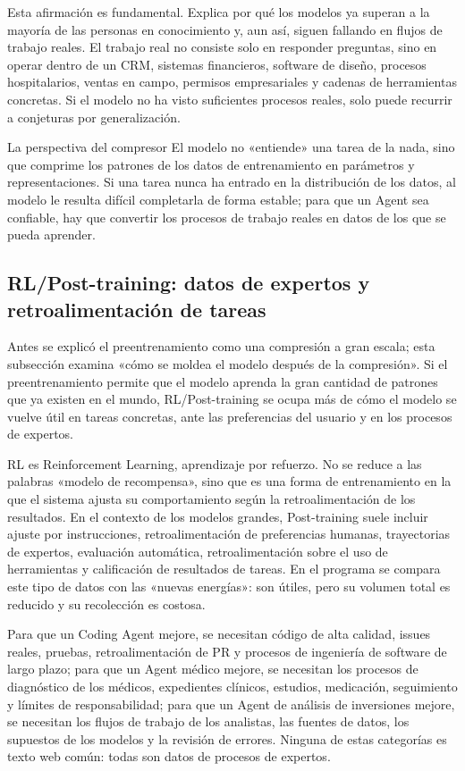 Esta afirmación es fundamental. Explica por qué los modelos ya superan a la mayoría de las personas en conocimiento y, aun así, siguen fallando en flujos de trabajo reales. El trabajo real no consiste solo en responder preguntas, sino en operar dentro de un CRM, sistemas financieros, software de diseño, procesos hospitalarios, ventas en campo, permisos empresariales y cadenas de herramientas concretas. Si el modelo no ha visto suficientes procesos reales, solo puede recurrir a conjeturas por generalización.

\begin{importantbox}{La perspectiva del compresor}
El modelo no «entiende» una tarea de la nada, sino que comprime los patrones de los datos de entrenamiento en parámetros y representaciones. Si una tarea nunca ha entrado en la distribución de los datos, al modelo le resulta difícil completarla de forma estable; para que un Agent sea confiable, hay que convertir los procesos de trabajo reales en datos de los que se pueda aprender.
\end{importantbox}

\subsection{RL/Post-training: datos de expertos y retroalimentación de tareas}

Antes se explicó el preentrenamiento como una compresión a gran escala; esta subsección examina «cómo se moldea el modelo después de la compresión». Si el preentrenamiento permite que el modelo aprenda la gran cantidad de patrones que ya existen en el mundo, RL/Post-training se ocupa más de cómo el modelo se vuelve útil en tareas concretas, ante las preferencias del usuario y en los procesos de expertos.

RL es Reinforcement Learning, aprendizaje por refuerzo. No se reduce a las palabras «modelo de recompensa», sino que es una forma de entrenamiento en la que el sistema ajusta su comportamiento según la retroalimentación de los resultados. En el contexto de los modelos grandes, Post-training suele incluir ajuste por instrucciones, retroalimentación de preferencias humanas, trayectorias de expertos, evaluación automática, retroalimentación sobre el uso de herramientas y calificación de resultados de tareas. En el programa se compara este tipo de datos con las «nuevas energías»: son útiles, pero su volumen total es reducido y su recolección es costosa.

Para que un Coding Agent mejore, se necesitan código de alta calidad, issues reales, pruebas, retroalimentación de PR y procesos de ingeniería de software de largo plazo; para que un Agent médico mejore, se necesitan los procesos de diagnóstico de los médicos, expedientes clínicos, estudios, medicación, seguimiento y límites de responsabilidad; para que un Agent de análisis de inversiones mejore, se necesitan los flujos de trabajo de los analistas, las fuentes de datos, los supuestos de los modelos y la revisión de errores. Ninguna de estas categorías es texto web común: todas son datos de procesos de expertos.

